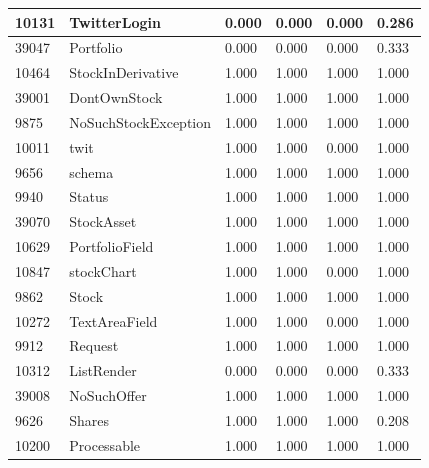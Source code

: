 \documentclass[a4paper]{article}
\newlength{\DUtablewidth} %
\begin{document}
\begin{longtable*}[c]{|p{0.160\DUtablewidth}|p{0.160\DUtablewidth}|p{0.160\DUtablewidth}|p{0.160\DUtablewidth}|p{0.160\DUtablewidth}|p{0.160\DUtablewidth}|}
10131
 & 
TwitterLogin
 & 
0.000
 & 
0.000
 & 
0.000
 & 
0.286
 \\
\hline

39047
 & 
Portfolio
 & 
0.000
 & 
0.000
 & 
0.000
 & 
0.333
 \\
\hline

10464
 & 
StockInDerivative
 & 
1.000
 & 
1.000
 & 
1.000
 & 
1.000
 \\
\hline

39001
 & 
DontOwnStock
 & 
1.000
 & 
1.000
 & 
1.000
 & 
1.000
 \\
\hline

9875
 & 
NoSuchStockException
 & 
1.000
 & 
1.000
 & 
1.000
 & 
1.000
 \\
\hline

10011
 & 
twit
 & 
1.000
 & 
1.000
 & 
0.000
 & 
1.000
 \\
\hline

9656
 & 
schema
 & 
1.000
 & 
1.000
 & 
1.000
 & 
1.000
 \\
\hline

9940
 & 
Status
 & 
1.000
 & 
1.000
 & 
1.000
 & 
1.000
 \\
\hline

39070
 & 
StockAsset
 & 
1.000
 & 
1.000
 & 
1.000
 & 
1.000
 \\
\hline

10629
 & 
PortfolioField
 & 
1.000
 & 
1.000
 & 
1.000
 & 
1.000
 \\
\hline

10847
 & 
stockChart
 & 
1.000
 & 
1.000
 & 
0.000
 & 
1.000
 \\
\hline

9862
 & 
Stock
 & 
1.000
 & 
1.000
 & 
1.000
 & 
1.000
 \\
\hline

10272
 & 
TextAreaField
 & 
1.000
 & 
1.000
 & 
0.000
 & 
1.000
 \\
\hline

9912
 & 
Request
 & 
1.000
 & 
1.000
 & 
1.000
 & 
1.000
 \\
\hline

10312
 & 
ListRender
 & 
0.000
 & 
0.000
 & 
0.000
 & 
0.333
 \\
\hline

39008
 & 
NoSuchOffer
 & 
1.000
 & 
1.000
 & 
1.000
 & 
1.000
 \\
\hline

9626
 & 
Shares
 & 
1.000
 & 
1.000
 & 
1.000
 & 
0.208
 \\
\hline

10200
 & 
Processable
 & 
1.000
 & 
1.000
 & 
1.000
 & 
1.000
 \\
\hline


\end{longtable*}
\end{document}

